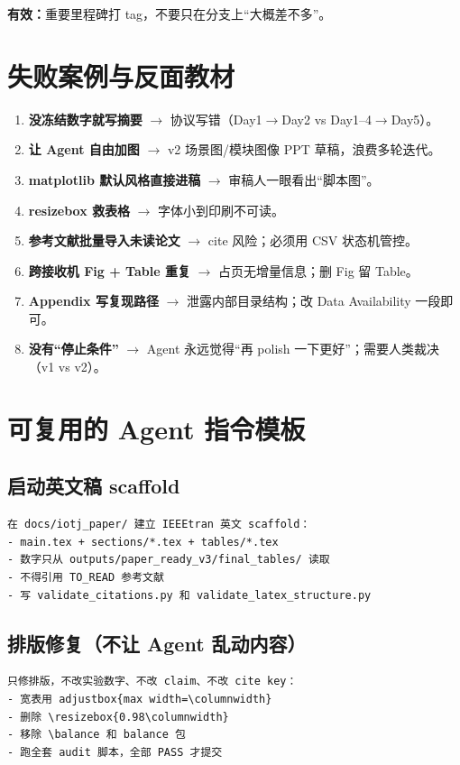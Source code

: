 \documentclass[11pt,a4paper]{ctexart}
\newcommand{\good}[1]{\textcolor{green!50!black}{\textbf{有效：}#1}}
\begin{document}
\good{重要里程碑打 tag，不要只在分支上``大概差不多''。}

\section{失败案例与反面教材}

\begin{enumerate}
  \item \textbf{没冻结数字就写摘要} $\to$ 协议写错（Day1$\to$Day2 vs Day1--4$\to$Day5）。
  \item \textbf{让 Agent 自由加图} $\to$ v2 场景图/模块图像 PPT 草稿，浪费多轮迭代。
  \item \textbf{matplotlib 默认风格直接进稿} $\to$ 审稿人一眼看出``脚本图''。
  \item \textbf{resizebox 救表格} $\to$ 字体小到印刷不可读。
  \item \textbf{参考文献批量导入未读论文} $\to$ cite 风险；必须用 CSV 状态机管控。
  \item \textbf{跨接收机 Fig + Table 重复} $\to$ 占页无增量信息；删 Fig 留 Table。
  \item \textbf{Appendix 写复现路径} $\to$ 泄露内部目录结构；改 Data Availability 一段即可。
  \item \textbf{没有``停止条件''} $\to{}$ Agent 永远觉得``再 polish 一下更好''；需要人类裁决（v1 vs v2）。
\end{enumerate}

\section{可复用的 Agent 指令模板}

\subsection{启动英文稿 scaffold}
\begin{verbatim}
在 docs/iotj_paper/ 建立 IEEEtran 英文 scaffold：
- main.tex + sections/*.tex + tables/*.tex
- 数字只从 outputs/paper_ready_v3/final_tables/ 读取
- 不得引用 TO_READ 参考文献
- 写 validate_citations.py 和 validate_latex_structure.py
\end{verbatim}

\subsection{排版修复（不让 Agent 乱动内容）}
\begin{verbatim}
只修排版，不改实验数字、不改 claim、不改 cite key：
- 宽表用 adjustbox{max width=\columnwidth}
- 删除 \resizebox{0.98\columnwidth}
- 移除 \balance 和 balance 包
- 跑全套 audit 脚本，全部 PASS 才提交
\end{verbatim}
\end{document}
